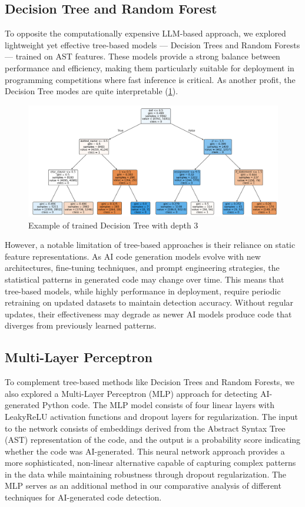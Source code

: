 \documentclass{article}
\begin{document}
\subsection{Decision Tree and Random Forest}
To opposite the computationally expensive LLM-based approach, we explored lightweight yet effective tree-based models --- Decision Trees and Random Forests --- trained on AST features. These models provide a strong balance between performance and efficiency, making them particularly suitable for deployment in programming competitions where fast inference is critical. As another profit, the Decision Tree modes are quite interpretable (\cref{fig:dt}).

\begin{figure}[H]
  \centering
  \includegraphics[width=1\textwidth]{./pictures/dt.png}
  \caption{Example of trained Decision Tree with depth 3}\label{fig:dt}
\end{figure}

However, a notable limitation of tree-based approaches is their reliance on static feature representations. As AI code generation models evolve with new architectures, fine-tuning techniques, and prompt engineering strategies, the statistical patterns in generated code may change over time. This means that tree-based models, while highly performance in deployment, require periodic retraining on updated datasets to maintain detection accuracy. Without regular updates, their effectiveness may degrade as newer AI models produce code that diverges from previously learned patterns.


\subsection{Multi-Layer Perceptron}
To complement tree-based methods like Decision Trees and Random Forests, we also explored a Multi-Layer Perceptron (MLP) approach for detecting AI-generated Python code. The MLP model consists of four linear layers with LeakyReLU activation functions and dropout layers for regularization. The input to the network consists of embeddings derived from the Abstract Syntax Tree (AST) representation of the code, and the output is a probability score indicating whether the code was AI-generated. This neural network approach provides a more sophisticated, non-linear alternative capable of capturing complex patterns in the data while maintaining robustness through dropout regularization. The MLP serves as an additional method in our comparative analysis of different techniques for AI-generated code detection.
\end{document}
